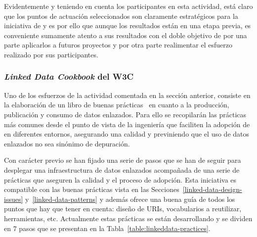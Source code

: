 Evidentemente y teniendo en cuenta los participantes en esta actividad, está claro que los puntos de actuación
seleccionados son claramente estratégicos para la iniciativa de \linkeddata y es por ello que aunque
los resultados están en una etapa previa, es conveniente sumamente atento a sus resultados con el doble objetivo
de por una parte aplicarlos a futuros proyectos y por otra parte realimentar el esfuerzo realizado por sus participantes.

\subsubsection{\textit{Linked Data Cookbook} del W3C}\label{linked-data-cookbook}
Uno de los esfuerzos de la actividad comentada en la sección anterior, consiste
en la elaboración de un libro de buenas prácticas~\cite{linked-data-cookbook} en cuanto a la producción, publicación y consumo de 
datos enlazados. Para ello se recopilarán las prácticas más comunes
desde el punto de vista de la ingeniería que faciliten la adopción de \linkeddata en 
diferentes entornos, asegurando una calidad y previniendo que el uso de datos enlazados
no sea sinónimo de depuración.

Con carácter previo se han fijado una serie de pasos que se han de seguir para desplegar
una infraestructura de datos enlazados acompañada de una serie de prácticas que aseguren
la calidad y el proceso de adopción. Esta iniciativa es compatible con las buenas prácticas
vista en las Secciones~\ref{linked-data-design-issues} y~\ref{linked-data-patterns} y además
ofrece una buena guía de todos los puntos que hay que tener en cuenta: diseño de URIs, vocabularios
a reutilizar, herramientas, etc. Actualmente estas prácticas se están desarrollando y 
se dividen en $7$ pasos que se presentan en la Tabla~\ref{table:linkeddata-practices}.


